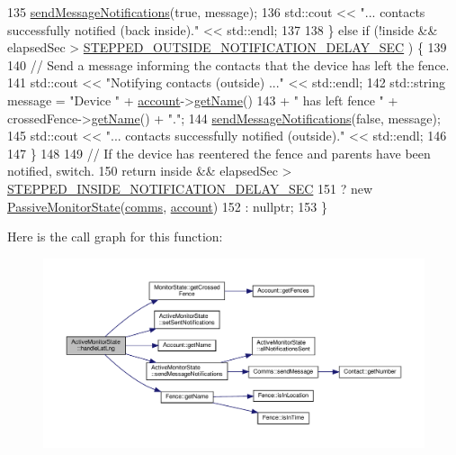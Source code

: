 \begin{DoxyCode}
135         \hyperlink{class_active_monitor_state_aae5b3a425c74e7017446be277d69c06d}{sendMessageNotifications}(\textcolor{keyword}{true}, message);
136         std::cout << \textcolor{stringliteral}{"... contacts successfully notified (back inside)."} << std::endl;
137 
138     \} \textcolor{keywordflow}{else} \textcolor{keywordflow}{if} (!inside && elapsedSec > \hyperlink{_active_monitor_state_8cpp_a61900fdfa0a56947870551db86143a1c}{STEPPED\_OUTSIDE\_NOTIFICATION\_DELAY\_SEC}
      ) \{
139 
140         \textcolor{comment}{// Send a message informing the contacts that the device has left the fence.}
141         std::cout << \textcolor{stringliteral}{"Notifying contacts (outside) ..."} << std::endl;
142         std::string message = \textcolor{stringliteral}{"Device "} + \hyperlink{class_monitor_state_a41128d4942ec0d5b107c63d1d95af811}{account}->\hyperlink{class_account_a1ef22885e8c6f145475c3306a4e6d74a}{getName}()
143                               + \textcolor{stringliteral}{" has left fence "} + crossedFence->\hyperlink{class_fence_a1d90d0ff61bec6cda8240f6365fc5d28}{getName}() + \textcolor{stringliteral}{"."};
144         \hyperlink{class_active_monitor_state_aae5b3a425c74e7017446be277d69c06d}{sendMessageNotifications}(\textcolor{keyword}{false}, message);
145         std::cout << \textcolor{stringliteral}{"... contacts successfully notified (outside)."} << std::endl;
146 
147     \}
148 
149     \textcolor{comment}{// If the device has reentered the fence and parents have been notified, switch.}
150     \textcolor{keywordflow}{return} inside && elapsedSec > \hyperlink{_active_monitor_state_8cpp_af734ccbfe87f3ed675b4836ae5761dbb}{STEPPED\_INSIDE\_NOTIFICATION\_DELAY\_SEC}
151            ? \textcolor{keyword}{new} \hyperlink{class_passive_monitor_state}{PassiveMonitorState}(\hyperlink{class_monitor_state_a41914e9963c67ef2d17774f04bad3518}{comms}, \hyperlink{class_monitor_state_a41128d4942ec0d5b107c63d1d95af811}{account})
152            : nullptr;
153 \}
\end{DoxyCode}
Here is the call graph for this function\+:
\nopagebreak
\begin{figure}[H]
\begin{center}
\leavevmode
\includegraphics[width=350pt]{d9/db8/class_active_monitor_state_a0eb7622ad3aa4d372d90589838cb50a9_cgraph}
\end{center}
\end{figure}
